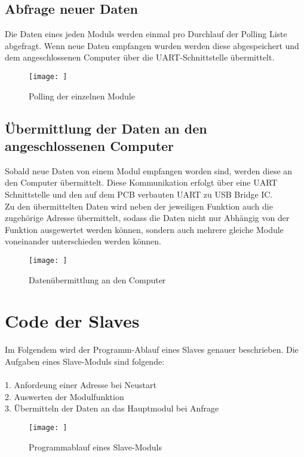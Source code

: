 \subsection{Abfrage neuer Daten}
\textmd{
Die Daten eines jeden Moduls werden einmal pro Durchlauf der Polling Liste abgefragt. Wenn neue Daten empfangen wurden werden diese abgespeichert und dem angeschlossenen Computer über die UART-Schnittstelle übermittelt.
}
\begin{figure}[H]
    \centering    
    \texttt{[image: ]}
    \caption{Polling der einzelnen Module}
    \label{polling()}
\end{figure}
\textmd{
}


\subsection{Übermittlung der Daten an den angeschlossenen Computer}
\textmd{Sobald neue Daten von einem Modul empfangen worden sind, werden diese an den Computer übermittelt. Diese Kommunikation erfolgt über eine UART Schnittstelle und den auf dem PCB verbauten UART zu USB Bridge IC. \\
Zu den übermittelten Daten wird neben der jeweiligen Funktion auch die zugehörige Adresse übermittelt, sodass die Daten nicht nur Abhängig von der Funktion ausgewertet werden können, sondern auch mehrere gleiche Module voneinander unterschieden werden können.  
}
\begin{figure}[H]
    \centering    
    \texttt{[image: ]}
    \caption{Datenübermittlung an den Computer}
    \label{usb()}
\end{figure}

\section{Code der Slaves}
\textmd{Im Folgendem wird der Programm-Ablauf eines Slaves genauer beschrieben. Die Aufgaben eines Slave-Moduls sind folgende:\\\\
1. Anfordeung einer Adresse bei Neustart\\
2. Auswerten der Modulfunktion\\
3. Übermitteln der Daten an das Hauptmodul bei Anfrage\\
}
\begin{figure}[H]
    \centering    
    \texttt{[image: ]}
    \caption{Programmablauf eines Slave-Moduls}
    \label{Programm_Slaves}
\end{figure}
